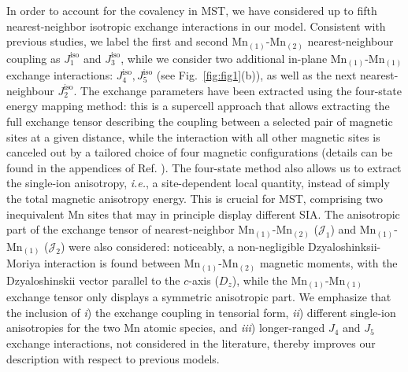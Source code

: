 \documentclass[preprint,amsmath,amssymb,aps,nofootinbib,superscriptaddress]{revtex4-2}
\begin{document}
In order to account for the covalency in MST, we have considered up to fifth nearest-neighbor isotropic exchange interactions in our model. Consistent with previous studies, we label the first and second Mn$_{(1)}$-Mn$_{(2)}$ nearest-neighbour coupling as $J^{\mathrm{iso}}_1$ and $J^{\mathrm{iso}}_3$, while we consider two additional in-plane Mn$_{(1)}$-Mn$_{(1)}$ exchange interactions: $J^{\mathrm{iso}}_4,J^{\mathrm{iso}}_5$ (see Fig.~\ref{fig:fig1}(b)), as well as the next nearest-neighbour $J^{\mathrm{iso}}_2$\cite{PRB2017May,Nature2021Seo}. The exchange parameters have been extracted using the four-state energy mapping method\cite{PRB2011Xiang,Dalton2013Xiang}: this is a supercell approach that allows extracting the full exchange tensor describing the coupling between a selected pair of magnetic sites at a given distance, while the interaction with all other magnetic sites is canceled out by a tailored choice of four magnetic configurations (details can be found in the appendices of Ref. \cite{Dalton2013Xiang}). The four-state method also allows us to extract the single-ion anisotropy, {\it i.e.}, a site-dependent local quantity, instead of simply the total magnetic anisotropy energy. This is crucial for MST, comprising two inequivalent Mn sites that may in principle display different SIA. The anisotropic part of the exchange tensor of nearest-neighbor Mn$_{(1)}$-Mn$_{(2)}$ ($\mathcal{J}_1$) and Mn$_{(1)}$-Mn$_{(1)}$ ($\mathcal{J}_2$) were also considered: noticeably, a non-negligible Dzyaloshinksii-Moriya interaction is found between Mn$_{(1)}$-Mn$_{(2)}$ magnetic moments, with the Dzyaloshinskii vector parallel to the $c$-axis ($D_z$), while the Mn$_{(1)}$-Mn$_{(1)}$ exchange tensor only displays a symmetric anisotropic part. We emphasize that  the inclusion of {\em i}) the exchange coupling in tensorial form, {\em ii}) different single-ion anisotropies for the two  Mn atomic species, and {\em iii}) longer-ranged $J_4$ and $J_5$ exchange interactions, not considered in the literature, thereby improves our description with respect to previous models.  
\end{document}
